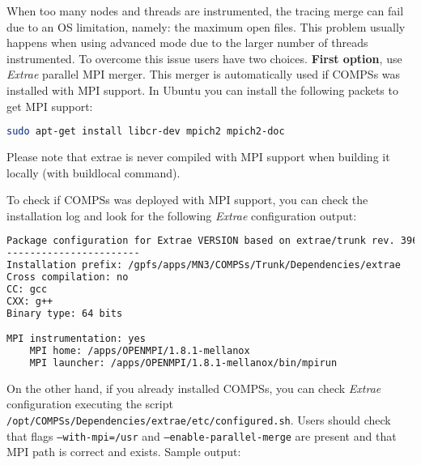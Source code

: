 When too many nodes and threads are instrumented, the tracing merge can fail due to an OS limitation, namely: the maximum open files. This problem usually happens when using advanced mode due to the larger number of threads instrumented. To overcome this issue users have two choices. \textbf{First option}, use \textit{Extrae} parallel MPI merger. This merger is automatically used if COMPSs was installed with MPI support. In Ubuntu you can install the following packets to get MPI support:

\begin{lstlisting}[language=bash]
sudo apt-get install libcr-dev mpich2 mpich2-doc
\end{lstlisting}

Please note that extrae is never compiled with MPI support when building it locally (with buildlocal command).

To check if COMPSs was deployed with MPI support, you can check the installation log and look for the following \textit{Extrae} configuration output:

\begin{lstlisting}[language=bash]
Package configuration for Extrae VERSION based on extrae/trunk rev. 3966:
-----------------------
Installation prefix: /gpfs/apps/MN3/COMPSs/Trunk/Dependencies/extrae
Cross compilation: no
CC: gcc
CXX: g++
Binary type: 64 bits

MPI instrumentation: yes
	MPI home: /apps/OPENMPI/1.8.1-mellanox
	MPI launcher: /apps/OPENMPI/1.8.1-mellanox/bin/mpirun
\end{lstlisting}

On the other hand, if you already installed COMPSs, you can check \textit{Extrae} configuration executing the script \texttt{/opt/COMPSs/Dependencies/extrae/etc/configured.sh}. Users should check that flags \texttt{--with-mpi=/usr} and \texttt{--enable-parallel-merge} are present and that MPI path is correct and exists. Sample output:

